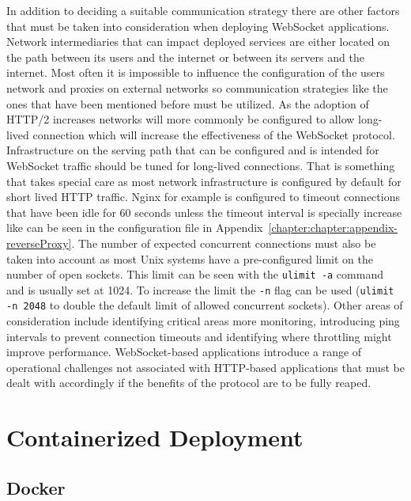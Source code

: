 In addition to deciding a suitable communication strategy there are other factors that must be taken into consideration when deploying WebSocket applications. Network intermediaries that can impact deployed services are either located on the path between its users and the internet or between its servers and the internet. Most often it is impossible to influence the configuration of the users network and proxies on external networks so communication strategies like the ones that have been mentioned before must be utilized. As the adoption of HTTP/2 increases networks will more commonly be configured to allow long-lived connection which will increase the effectiveness of the WebSocket protocol. Infrastructure on the serving path that can be configured and is intended for WebSocket traffic should be tuned for long-lived connections. That is something that takes special care as most network infrastructure is configured by default for short lived HTTP traffic. Nginx for example is configured to timeout connections that have been idle for 60 seconds unless the timeout interval is specially increase like can be seen in the configuration file in Appendix~\ref{chapter:chapter:appendix-reverseProxy}. The number of expected concurrent connections must also be taken into account as most Unix systems have a pre-configured limit on the number of open sockets. This limit can be seen with the \texttt{ulimit -a} command and is usually set at 1024. To increase the limit the \texttt{-n} flag can be used (\texttt{ulimit -n 2048} to double the default limit of allowed concurrent sockets). Other areas of consideration include identifying critical areas more monitoring, introducing ping intervals to prevent connection timeouts and identifying where throttling might improve performance. WebSocket-based applications introduce a range of operational challenges not associated with HTTP-based applications that must be dealt with accordingly if the benefits of the protocol are to be fully reaped.

\section{Containerized Deployment}

\subsection{Docker}